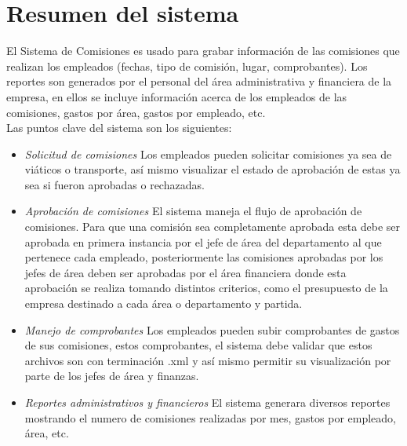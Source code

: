 \section{Resumen del sistema}

El Sistema de Comisiones es usado para grabar información de las comisiones que realizan los empleados (fechas, tipo de comisión, lugar, comprobantes). Los reportes son generados por el personal del área administrativa y financiera de la empresa, en ellos se incluye información acerca de los empleados de las comisiones, gastos por área, gastos por empleado, etc. \\

Las puntos clave del sistema son los siguientes:

\begin{itemize}
	\item \textit{Solicitud de comisiones} Los empleados pueden solicitar comisiones ya sea de viáticos o transporte, así mismo visualizar el estado de aprobación de estas ya sea si fueron aprobadas o rechazadas.
	
	\item \textit{Aprobación de comisiones} El sistema maneja el flujo de aprobación de comisiones. Para que una comisión sea completamente aprobada esta debe ser aprobada en primera instancia por el jefe de área del departamento al que pertenece cada empleado, posteriormente las comisiones aprobadas por los jefes de área deben ser aprobadas por el área financiera donde esta aprobación se realiza tomando distintos criterios, como el presupuesto de la empresa destinado a cada área o departamento y partida.
	
	\item \textit {Manejo de comprobantes} Los empleados pueden subir comprobantes de gastos de sus comisiones, estos comprobantes, el sistema debe validar que estos archivos son con terminación .xml y así mismo permitir su visualización por parte de los jefes de área y finanzas.
	
	\item \textit {Reportes administrativos y financieros} El sistema generara diversos reportes mostrando el numero de comisiones realizadas por mes, gastos por empleado, área, etc.
\end{itemize}
